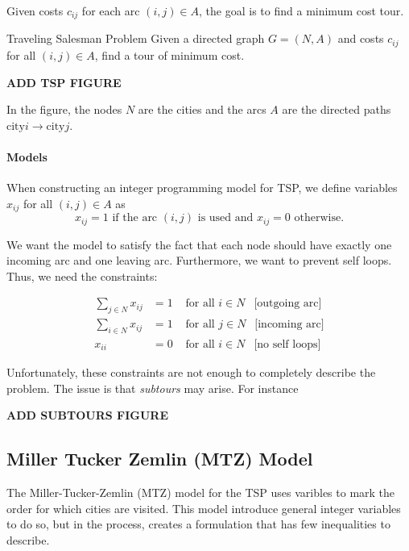 Given costs $c_{ij}$ for each arc $(i,j) \in A$, the goal is to find a minimum cost tour.


\begin{general}{Traveling Salesman Problem}{\nphard}
Given a directed graph $G = (N,A)$ and costs $c_{ij}$ for all $(i,j) \in A$, find a tour of minimum cost.
\end{general}
\begin{center}
\textbf{ADD TSP FIGURE}
\end{center}
In the figure, the nodes $N$ are the cities and the arcs $A$ are the directed paths $\text{city} i \to \text{city} j$.

\paragraph{Models}
When constructing an integer programming model for TSP, we define variables $x_{ij}$ for all $(i,j) \in A$ as 
$$
x_{ij } = 1 \text{ if the arc $(i,j)$ is used  and   }  x_{ij} = 0 \text{   otherwise.}
$$

We want the model to satisfy the fact that each node should have exactly one incoming arc and one leaving arc.  Furthermore, we want to prevent self loops.  Thus, we need the constraints:

\begin{align}
\label{eq:tsp-part-model}
\sum_{j\in N} x_{ij} &= 1 & \text{ for all } i \in N \ \ \text{ [outgoing arc]}\\
\sum_{i \in N} x_{ij} &= 1 & \text{ for all } j \in N \ \ \text{ [incoming arc]}\\
\label{eq:tsp-part-model3}
x_{ii} &= 0 & \text{ for all } i \in N \ \ \text{ [no self loops]} 
\end{align}

Unfortunately, these constraints are not enough to completely describe the problem.  The issue is that \emph{subtours} may arise.  For instance
\begin{center}
\textbf{ADD SUBTOURS FIGURE}
\end{center}
\subsection{Miller Tucker Zemlin (MTZ) Model}
The Miller-Tucker-Zemlin (MTZ) model for the TSP uses varibles to mark the order for which cities are visited.  This model introduce general integer variables to do so, but in the process, creates a formulation that has few inequalities to describe.

